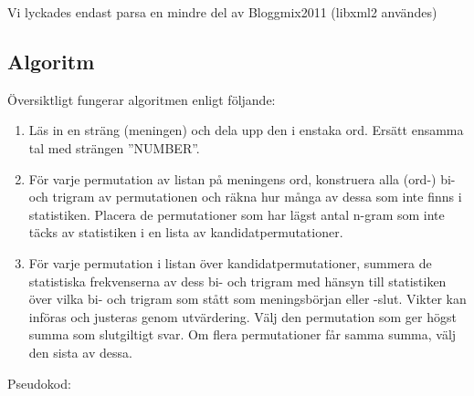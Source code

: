 \documentclass[a4paper,11pt]{article}
\begin{document}
\hfill {\footnotesize* Vi lyckades endast parsa en mindre del av Bloggmix2011 (libxml2 användes)}

\subsection*{Algoritm}
Översiktligt fungerar algoritmen enligt följande:

\begin{enumerate}
\item Läs in en sträng (meningen) och dela upp den i enstaka ord. Ersätt ensamma tal med strängen ''NUMBER''.
\item För varje permutation av listan på meningens ord, konstruera
alla (ord-) bi- och trigram av permutationen och räkna hur
många av dessa som inte finns i statistiken. Placera de
permutationer som har lägst antal n-gram som inte täcks
av statistiken i en lista av kandidatpermutationer.
\item För varje permutation i listan över kandidatpermutationer,
summera de statistiska frekvenserna av dess bi- och trigram
med hänsyn till statistiken över vilka bi- och trigram
som stått som meningsbörjan eller -slut. Vikter kan införas och justeras
genom utvärdering.
Välj den permutation som ger högst summa som slutgiltigt svar. Om
flera permutationer får samma summa, välj den sista av dessa.
\end{enumerate}

Pseudokod:
\end{document}
